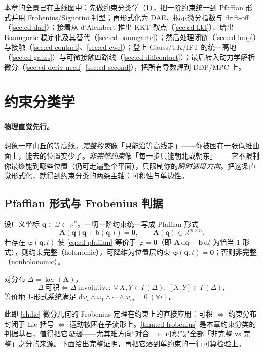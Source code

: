 本章的全景已在主线图中：先做约束分类学（\cref{sec:cd-classify}），把一阶约束统一到 Pfaffian 形式并用 Frobenius/Signorini 判型；再形式化为 DAE、揭示微分指数与 drift-off（\cref{sec:cd-dae}）；接着从 d'Alembert 推出 KKT 鞍点（\cref{sec:cd-kkt}）、给出 Baumgarte 稳定化及其替代（\cref{sec:cd-baumgarte}）；然后处理闭链（\cref{sec:cd-loop}）与接触（\cref{sec:cd-contact}、\cref{sec:cd-cwc}）；登上 Gauss/UK/IFT 的统一高地（\cref{sec:cd-gauss}）与可微接触四路线（\cref{sec:cd-diffcontact}）；最后转入动力学解析微分（\cref{sec:cd-deriv-need}--\cref{sec:cd-second}），把所有导数焊到 DDP/MPC 上。

\section{约束分类学}
\label{sec:cd-classify}

\paragraph{物理直觉先行。}
想象一座山丘的等高线。\emph{完整约束}像「只能沿等高线走」——你被困在一张低维曲面上，能去的位置变少了。\emph{非完整约束}像「每一步只能朝北或朝东」——它不限制你最终能到哪些位置（仍可走遍整个平面），只限制你的\emph{瞬时速度方向}。把这条直觉形式化，就得到约束分类的两条主轴：可积性与单边性。

\subsection{Pfaffian 形式与 Frobenius 判据}
设广义坐标 $\mathbf q\in\mathcal Q\subset\mathbb R^n$。一切一阶约束统一写成 Pfaffian 形式
\begin{equation}
  \mathbf A(\mathbf q)\dot{\mathbf q}+\mathbf b(\mathbf q,t)=\mathbf 0,\qquad \mathbf A(\mathbf q)\in\mathbb R^{m\times n}.
  \label{eq:cd-pfaffian}
\end{equation}
若存在 $\boldsymbol\varphi(\mathbf q,t)$ 使 \cref{eq:cd-pfaffian} 等价于 $\dot{\boldsymbol\varphi}=\mathbf 0$（即 $\mathbf A\,\mathrm d\mathbf q+\mathbf b\,\mathrm dt$ 为恰当 1-形式），则约束\textbf{完整}（holonomic），可降维为位置层约束 $\boldsymbol\varphi(\mathbf q,t)=\mathbf 0$；否则\textbf{非完整}（nonholonomic）。

\begin{theorem}[可积判据 = Frobenius\cite{lynch2017modern}]\label{thm:cd-frobenius}
对分布 $\Delta=\ker(\mathbf A)$，
\[
  \Delta\ \text{可积}\iff\Delta\ \text{involutive}:\ \forall\,X,Y\in\Gamma(\Delta),\ [X,Y]\in\Gamma(\Delta),
\]
等价地 1-形式系统满足 $\mathrm d\omega_i\wedge\omega_1\wedge\cdots\wedge\omega_m=0\ (\forall i)$。
\end{theorem}
\noindent 此即 \cref{ch:lie} 微分几何的 Frobenius 定理在约束上的直接应用：可积 $\Leftrightarrow$ 约束分布封闭于 Lie 括号 $\Leftrightarrow$ 运动被困在子流形上。\cref{thm:cd-frobenius} 是本章约束分类的判据基石，值得把它\emph{证透}——尤其难方向“对合 $\Rightarrow$ 可积”是全部「非完整 vs 完整」之分的来源。下面给出完整证明，再把它落到单约束的一行可算检验上。

